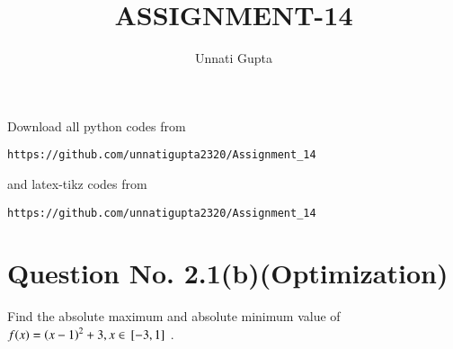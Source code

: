 \documentclass[journal,12pt,twocolumn]{IEEEtran}
\begin{document}
     \def\centbox#1{\makebox[0in]{#1}}
     \def\topbox#1{\raisebox{-\baselineskip}[0in][0in]{#1}}
     \def\midbox#1{\raisebox{-0.5\baselineskip}[0in][0in]{#1}}
\vspace{3cm}
\title{ASSIGNMENT-14}
\author{Unnati Gupta}
\maketitle
\newpage
\bigskip
\renewcommand{\thefigure}{\theenumi}
\renewcommand{\thetable}{\theenumi}
Download all python codes from 
\begin{lstlisting}
https://github.com/unnatigupta2320/Assignment_14
\end{lstlisting}
%
and latex-tikz codes from 
%
\begin{lstlisting}
https://github.com/unnatigupta2320/Assignment_14
\end{lstlisting}
%
\section{Question No. 2.1(b)(Optimization)}
Find the absolute maximum and absolute minimum value of $f(x)=\left(x-1\right)^2+3,x \in {}\left[-3,1\right]$ .
\end{document}
